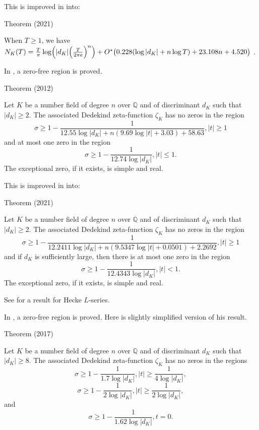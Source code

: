 This is improved in 
\cite{Hasanalizade-Shen-Wong*21}
into:

\par 
\begin{thm}{Theorem (2021)}

 When $T\ge1$, we have
 $N_K(T)=\frac{T}{\pi}\log\Bigl(|d_K|\Big(\frac{T}{2\pi e}\Bigr)^n\Bigr)
 +O^*\bigl(0.228(\log |d_K|+n\log T)+23.108 n+4.520\bigr)$ .
\end{thm}


In
\cite{Kadiri*12},
a zero-free region is proved.

\par 
\begin{thm}{Theorem (2012)}

Let $K$ be a number field of degree $n$ over $\mathbb{Q}$ and of
discriminant $d_K$ such that $|d_K| \ge 2$. The associated Dedekind
zeta-function $\zeta_K$ has no zeros in the region
$$
\sigma\ge 1-\frac{1}{12.55\log|d_K|+n(9.69\log|t|+3.03)+58.63}, |t|\ge1
$$
and at most one zero in the region
$$
\sigma\ge 1-\frac{1}{12.74\log|d_K|}, |t|\le 1.
$$
The exceptional zero, if it exists, is simple and real.
\end{thm}

This is improved in \cite{Lee*21a} into:

\par 
\begin{thm}{Theorem (2021)}

Let $K$ be a number field of degree $n$ over $\mathbb{Q}$ and of
discriminant $d_K$ such that $|d_K| \ge 2$. The associated Dedekind
zeta-function $\zeta_K$ has no zeros in the region
$$
\sigma\ge 1-\frac{1}{12.2411\log|d_K|+n(9.5347\log|t|+0.0501)+2.2692}, |t|\ge1 
$$
and if $d_K$ is sufficiently large, then there is at most one zero in the region
$$
\sigma\ge 1-\frac{1}{12.4343\log|d_K|}, |t|< 1.
$$
The exceptional zero, if it exists, is simple and real.
\end{thm}

See
\cite{Ahn-Kwon*14}
for a result for Hecke $L$-series.

In
\cite{Louboutin*17},
a zero-free region is proved. Here is slightly simplified version of
his result.

\par 
\begin{thm}{Theorem (2017)}

Let $K$ be a number field of degree $n$ over $\mathbb{Q}$ and of
discriminant $d_K$ such that $|d_K| \ge 8$. The associated Dedekind
zeta-function $\zeta_K$ has no zeros in the regions
$$
\sigma\ge 1-\frac{1}{1.7\log|d_K|}, |t|\ge\frac{1}{4\log|d_K|},
$$
$$
\sigma\ge 1-\frac{1}{2\log|d_K|}, |t|\ge\frac{1}{2\log|d_K|},
$$
and
$$
\sigma\ge 1-\frac{1}{1.62\log|d_K|}, t=0.
$$
\end{thm}




